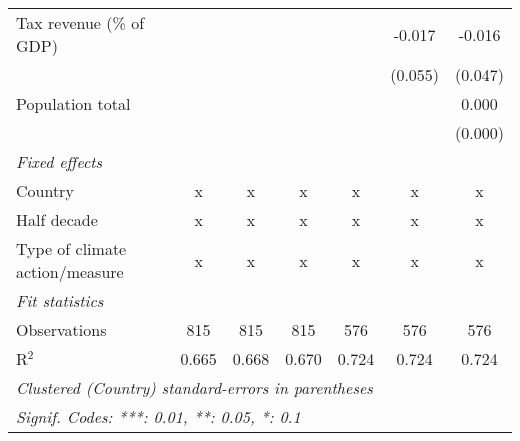 \begin{tabular}{lcccccc}
   Tax revenue (\% of GDP)                                               &         &                &                &                & -0.017         & -0.016\\   
                                                                         &         &                &                &                & (0.055)        & (0.047)\\   
   Population total                                                      &         &                &                &                &                & 0.000\\   
                                                                         &         &                &                &                &                & (0.000)\\   
   \emph{Fixed effects}\\
   Country                                                               & x       & x              & x              & x              & x              & x\\  
   Half decade                                                           & x       & x              & x              & x              & x              & x\\  
   Type of climate action/measure                                        & x       & x              & x              & x              & x              & x\\  
   \midrule \emph{Fit statistics}\\
   Observations                                                          & 815     & 815            & 815            & 576            & 576            & 576\\  
   R$^2$                                                                 & 0.665   & 0.668          & 0.670          & 0.724          & 0.724          & 0.724\\  
   \midrule
   \multicolumn{7}{l}{\emph{Clustered (Country) standard-errors in parentheses}}\\
   \multicolumn{7}{l}{\emph{Signif. Codes: ***: 0.01, **: 0.05, *: 0.1}}\\
\end{tabular}
\par\endgroup


